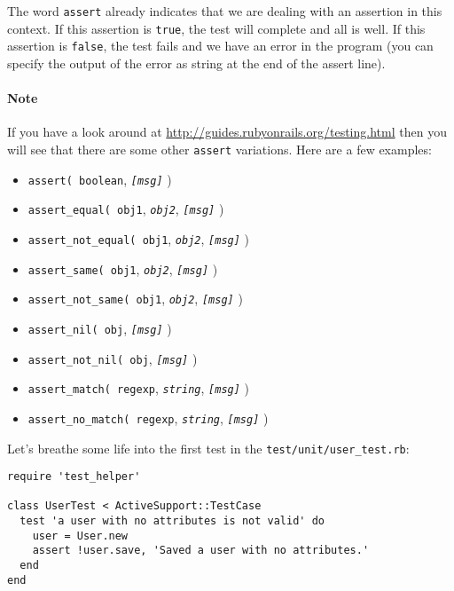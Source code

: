 \documentclass[a4paper]{book}
\begin{document}
The word \texttt{assert} already indicates that we are dealing with an assertion in this context. If this assertion is \texttt{true}, the test will complete and all is well. If this assertion is \texttt{false}, the test fails and we have an error in the program (you can specify the output of the error as string at the end of the assert line).

\paragraph{Note}\label{note-41}

If you have a look around at \url{http://guides.rubyonrails.org/testing.html} then you will see that there are some other \texttt{assert} variations. Here are a few examples:

\begin{itemize}
\itemsep1pt\parskip0pt
\item
  \texttt{assert( boolean}, \emph{\texttt{{[}msg{]}}} )
\item
  \texttt{assert\_equal( obj1}, \emph{\texttt{obj2}}, \emph{\texttt{{[}msg{]}}} )
\item
  \texttt{assert\_not\_equal( obj1}, \emph{\texttt{obj2}}, \emph{\texttt{{[}msg{]}}} )
\item
  \texttt{assert\_same( obj1}, \emph{\texttt{obj2}}, \emph{\texttt{{[}msg{]}}} )
\item
  \texttt{assert\_not\_same( obj1}, \emph{\texttt{obj2}}, \emph{\texttt{{[}msg{]}}} )
\item
  \texttt{assert\_nil( obj}, \emph{\texttt{{[}msg{]}}} )
\item
  \texttt{assert\_not\_nil( obj}, \emph{\texttt{{[}msg{]}}} )
\item
  \texttt{assert\_match( regexp}, \emph{\texttt{string}}, \emph{\texttt{{[}msg{]}}} )
\item
  \texttt{assert\_no\_match( regexp}, \emph{\texttt{string}}, \emph{\texttt{{[}msg{]}}} )
\end{itemize}

Let's breathe some life into the first test in the \texttt{test/unit/user\_test.rb}:

\begin{shaded}\begin{verbatim}
require 'test_helper'

class UserTest < ActiveSupport::TestCase
  test 'a user with no attributes is not valid' do
    user = User.new
    assert !user.save, 'Saved a user with no attributes.'
  end
end
\end{verbatim}\end{shaded}
\end{document}
